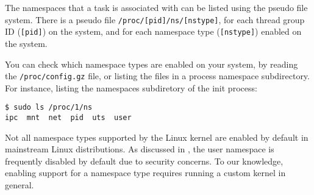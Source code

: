 The namespaces that a task is associated with can be listed using the
\cite{man-5-proc} pseudo file system. There is a pseudo file
\texttt{/proc/[pid]/ns/[nstype]}, for each thread group ID (\texttt{[pid]}) on
the system, and for each namespace type (\texttt{[nstype]}) enabled on the
system.

You can check which namespace types are enabled on your system, by reading the
\texttt{/proc/config.gz} file, or listing the files in a process namespace
subdirectory. For instance, listing the namespaces subdiretory of the init
process:

\begin{lstlisting}
$ sudo ls /proc/1/ns
ipc  mnt  net  pid  uts  user
\end{lstlisting}

Not all namespace types supported by the Linux kernel are enabled by default in
mainstream Linux distributions. As discussed in
, the user namespace is frequently
disabled by default due to security concerns. To our knowledge, enabling
support for a namespace type requires running a custom kernel in general.
